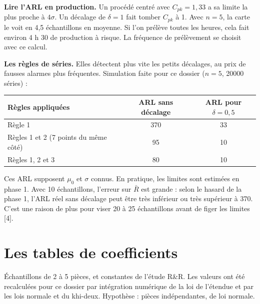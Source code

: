 \documentclass[11pt,a4paper]{article}
\newcommand{\Rb}{\bar{R}}
\begin{document}
\textbf{Lire l'ARL en production.} Un procédé centré avec $C_{pk}=1{,}33$ a sa limite la plus proche à $4\sigma$. Un décalage de $\delta=1$ fait tomber $C_{pk}$ à 1. Avec $n=5$, la carte le voit en 4,5 échantillons en moyenne. Si l'on prélève toutes les heures, cela fait environ 4 h 30 de production à risque. La fréquence de prélèvement se choisit avec ce calcul.

\textbf{Les règles de séries.} Elles détectent plus vite les petits décalages, au prix de fausses alarmes plus fréquentes. Simulation faite pour ce dossier ($n=5$, \num{20000} séries) :
\begin{center}\small
\begin{tabular}{@{}lcc@{}}\toprule
Règles appliquées & ARL sans décalage & ARL pour $\delta=0{,}5$\\\midrule
Règle 1 & 370 & 33\\
Règles 1 et 2 (7 points du même côté) & 95 & 10\\
Règles 1, 2 et 3 & 80 & 10\\\bottomrule
\end{tabular}
\end{center}

\begin{attention}
Ces ARL supposent $\mu_0$ et $\sigma$ connus. En pratique, les limites sont estimées en phase 1. Avec 10 échantillons, l'erreur sur $\Rb$ est grande : selon le hasard de la phase 1, l'ARL réel sans décalage peut être très inférieur ou très supérieur à 370. C'est une raison de plus pour viser 20 à 25 échantillons avant de figer les limites [4].
\end{attention}

\clearpage
\section{Les tables de coefficients}\label{sec:D}
Échantillons de 2 à 5 pièces, et constantes de l'étude R\&R. Les valeurs ont été recalculées pour ce dossier par intégration numérique de la loi de l'étendue et par les lois normale et du khi-deux. Hypothèse : pièces indépendantes, de loi normale.
\end{document}
